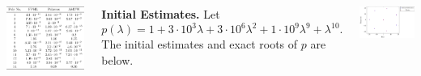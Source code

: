 \documentclass[20 pt, a0paper, portrait]{tikzposter}
\begin{document}
\begin{columns}
{\begin{center}
\begin{tikzfigure}
		\includegraphics[scale=0.41]{../tests/figures/spec_poly_results.png}
		\end{tikzfigure}
	\end{center}
	}
	
	{
	\textbf{Initial Estimates.} Let
	\[
	p(\lambda)=1+3\cdot10^{3}\lambda+3\cdot10^{6}\lambda^{2}+1\cdot10^{9}\lambda^{9}+\lambda^{10}.
	\] 
	The initial estimates and exact roots of $p$ are below.
	\begin{tikzfigure}
	\centering
	\includegraphics[scale=0.85]{../tests/figures/init_est_acc.png}
	\end{tikzfigure}
	
}
\end{columns}
\end{document}
